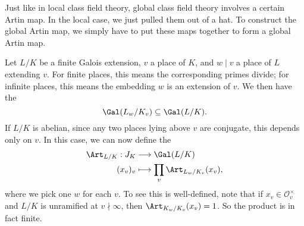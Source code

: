 \documentclass[a4paper]{article}
\begin{document}
Just like in local class field theory, global class field theory involves a certain Artin map. In the local case, we just pulled them out of a hat. To construct the global Artin map, we simply have to put these maps together to form a global Artin map.

Let $L/K$ be a finite Galois extension, $v$ a place of $K$, and $w \mid v$ a place of $L$ extending $v$. For finite places, this means the corresponding primes divide; for infinite places, this means the embedding $w$ is an extension of $v$. We then have the 
\[
  \Gal(L_w/K_v) \subseteq \Gal(L/K).
\]
If $L/K$ is abelian, since any two places lying above $v$ are conjugate, this depends only on $v$. In this case, we can now define the 
\begin{align*}
  \Art_{L/K}: J_K &\longrightarrow \Gal(L/K)\\
  (x_v)_v &\longmapsto \prod_v \Art_{L_w/K_v} (x_v),
\end{align*}
where we pick one $w$ for each $v$. To see this is well-defined, note that if $x_v \in \mathcal{O}_v^\times$ and $L/K$ is unramified at $v \nmid \infty$, then $\Art_{K_w/K_v}(x_v) = 1$. So the product is in fact finite.
\end{document}
